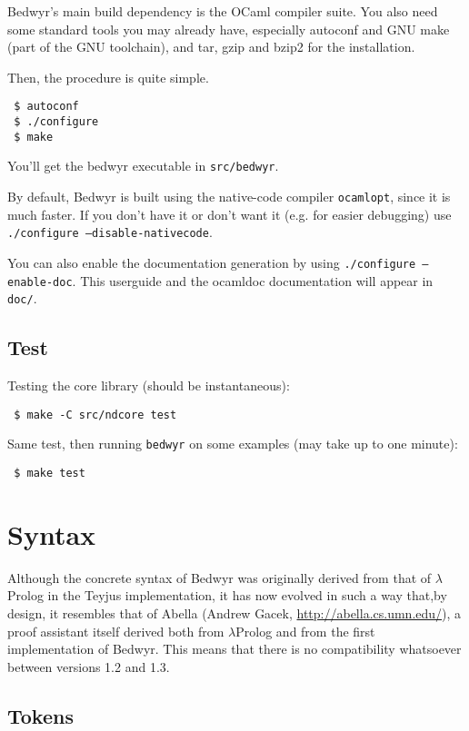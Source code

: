 \documentclass{article}
\newcommand{\lp}{$\lambda$Prolog}
\begin{document}
Bedwyr's main build dependency is the OCaml compiler suite.
You also need some standard tools you may already have, especially
autoconf and GNU make (part of the GNU toolchain),
and tar, gzip and bzip2 for the installation.

Then, the procedure is quite simple.

\begin{verbatim}
 $ autoconf
 $ ./configure
 $ make
\end{verbatim}

You'll get the bedwyr executable in \texttt{src/bedwyr}.

By default, Bedwyr is built using the native-code compiler \texttt{ocamlopt},
since it is much faster. If you don't have it or don't want it (e.g.
for easier debugging) use \texttt{./configure --disable-nativecode}.

You can also enable the documentation generation by using
\texttt{./configure --enable-doc}. This userguide and the ocamldoc
documentation will appear in \texttt{doc/}.

\subsection{Test}

Testing the core library (should be instantaneous):
\begin{verbatim}
 $ make -C src/ndcore test
\end{verbatim}
Same test, then running {\tt bedwyr} on some examples (may take up to
one minute):
\begin{verbatim}
 $ make test
\end{verbatim}


\section{Syntax}

Although the concrete syntax of Bedwyr was originally derived from that
of \lp{} in the Teyjus implementation\cite{nadathur99cade}, it has
now evolved in such a way that,by design, it resembles that of Abella
(Andrew Gacek,
\urldef{\thisurl}\url{http://abella.cs.umn.edu/}\ahrefurl{\thisurl}), a
proof assistant itself derived both from \lp{} and from the first
implementation of Bedwyr. This means that there is no compatibility
whatsoever between versions 1.2 and 1.3.

\subsection{Tokens}
\end{document}
